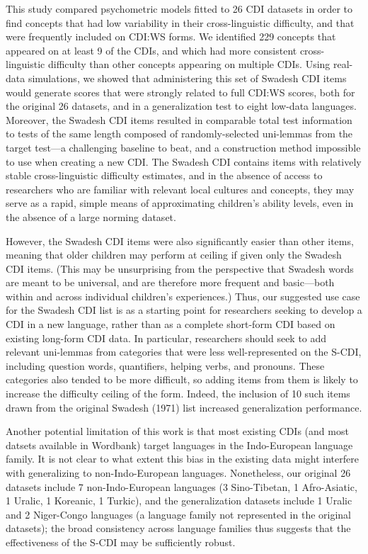 \documentclass[10pt, letterpaper]{article}
\begin{document}
This study compared psychometric models fitted to 26 CDI datasets in
order to find concepts that had low variability in their
cross-linguistic difficulty, and that were frequently included on CDI:WS
forms. We identified 229 concepts that appeared on at least 9 of the
CDIs, and which had more consistent cross-linguistic difficulty than
other concepts appearing on multiple CDIs. Using real-data simulations,
we showed that administering this set of Swadesh CDI items would
generate scores that were strongly related to full CDI:WS scores, both
for the original 26 datasets, and in a generalization test to eight
low-data languages. Moreover, the Swadesh CDI items resulted in
comparable total test information to tests of the same length composed
of randomly-selected uni-lemmas from the target test---a challenging
baseline to beat, and a construction method impossible to use when
creating a new CDI. The Swadesh CDI contains items with relatively
stable cross-linguistic difficulty estimates, and in the absence of
access to researchers who are familiar with relevant local cultures and
concepts, they may serve as a rapid, simple means of approximating
children's ability levels, even in the absence of a large norming
dataset.

However, the Swadesh CDI items were also significantly easier than other
items, meaning that older children may perform at ceiling if given only
the Swadesh CDI items. (This may be unsurprising from the perspective
that Swadesh words are meant to be universal, and are therefore more
frequent and basic---both within and across individual children's
experiences.) Thus, our suggested use case for the Swadesh CDI list is
as a starting point for researchers seeking to develop a CDI in a new
language, rather than as a complete short-form CDI based on existing
long-form CDI data. In particular, researchers should seek to add
relevant uni-lemmas from categories that were less well-represented on
the S-CDI, including question words, quantifiers, helping verbs, and
pronouns. These categories also tended to be more difficult, so adding
items from them is likely to increase the difficulty ceiling of the
form. Indeed, the inclusion of 10 such items drawn from the original
Swadesh (1971) list increased generalization performance.

Another potential limitation of this work is that most existing CDIs
(and most datsets available in Wordbank) target languages in the
Indo-European language family. It is not clear to what extent this bias
in the existing data might interfere with generalizing to
non-Indo-European languages. Nonetheless, our original 26 datasets
include 7 non-Indo-European languages (3 Sino-Tibetan, 1 Afro-Asiatic, 1
Uralic, 1 Koreanic, 1 Turkic), and the generalization datasets include 1
Uralic and 2 Niger-Congo languages (a language family not represented in
the original datasets); the broad consistency across language families
thus suggests that the effectiveness of the S-CDI may be sufficiently
robust.
\end{document}
